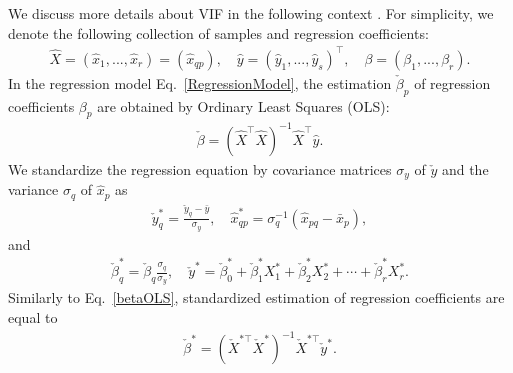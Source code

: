 \begin{remark}
	We discuss more details about VIF in the following context \cite{Kutner1985}. For simplicity, we denote the following collection of samples and regression coefficients:
	\begin{align*}
		\hat{X} = (\hat{x}_1,...,\hat{x}_r) = (\hat{x}_{qp}), \quad \hat{y} = (\hat{y}_1,...,\hat{y}_s)^{\top}, \quad \beta = (\beta_1,...,\beta_r).
	\end{align*}
	In the regression model Eq.~\eqref{RegressionModel}, the estimation $\check{\beta}_p$ of regression coefficients $\beta_p$ are obtained by Ordinary Least Squares (OLS):
	\begin{align} \label{betaOLS}
		\check{\beta} = (\hat{X}^{\top} \hat{X})^{-1} \hat{X}^{\top} \hat{y}.
	\end{align}
	We standardize the regression equation by covariance matrices $\sigma_y$ of $\check{y}$ and the variance $\sigma_q$ of $\hat{x}_{p}$ as
	\begin{align}
		\check{y}_q^\ast = \frac{\check{y}_q - \bar{y}}{\sigma_y}, \quad \hat{x}_{qp}^\ast = \sigma_q^{-1}(\hat{x}_{pq}-\bar{x}_p),
	\end{align}
	and 
	\begin{align}
		\label{xy}
		\check{\beta}_q^\ast = \check{\beta}_q \frac{\sigma_q}{\sigma_y} , \quad
		\check{y}^\ast = \check{\beta}_0^\ast + \check{\beta}_1^\ast X_1^\ast + \check{\beta}_2^\ast X_2^\ast + \cdots + \check{\beta}_r^\ast X_r^\ast.
	\end{align}
	Similarly to Eq.~\eqref{betaOLS}, standardized estimation of regression coefficients are equal to
	\begin{align} \label{beta}
		\check{\beta}^\ast = (\check{X}^{\ast \top} \check{X}^\ast)^{-1} \check{X}^{\ast \top}\check{y}^\ast.
	\end{align}
	

\end{remark}
